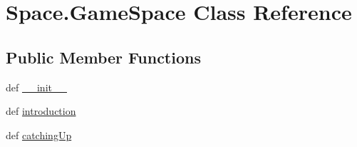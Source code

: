 \hypertarget{classSpace_1_1GameSpace}{\section{\-Space.\-Game\-Space \-Class \-Reference}
\label{classSpace_1_1GameSpace}
}
\subsection*{\-Public \-Member \-Functions}
\begin{DoxyCompactItemize}
\item 
def \hyperlink{classSpace_1_1GameSpace_a31fbc302c7a9b15482894119be7a8b0b}{\-\_\-\-\_\-init\-\_\-\-\_\-}
\item 
def \hyperlink{classSpace_1_1GameSpace_ad7e82ea74fef698b9e719c93f271b1c9}{introduction}
\item 
def \hyperlink{classSpace_1_1GameSpace_aa086446350cd97bda910f904ed778008}{catching\-Up}
\end{DoxyCompactItemize}
